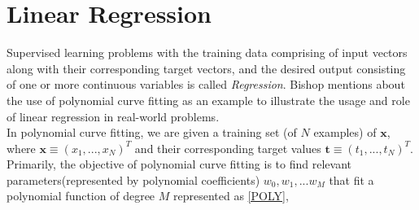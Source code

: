 \documentclass[12pt,twoside,a4paper]{article}
\title{\mytitle}
\author{\myauthors}
\date{\mydate}
\begin{document}
\maketitle

\begin{abstract}

In this day and age, automation is crucial in various industries which involve laborious and repetitive tasks. This project covers regression and classification problems, which are considered to be one of basic techniques of \textit{Pattern Recognition}. I've implemented linear models for regression, along with methods to optimize the parameters/weights of these models through the use of \textit{Maximum Likelihood Estimation} and \textit{Maximum A Posteriori Estimation}. Additonally, for classification models I've implemented the Fisher projection algorithm for the \textit{Taiji} dataset. I've also introduced the key aspects of the \textit{Central Limit Theorem}, in addition to answering few questions regarding estimating probability distributions.

\end{abstract}
\vspace{1ex}

\tableofcontents
\vfill
\pagebreak


\section{Linear Regression}

Supervised learning problems with the training data comprising of input vectors along with their corresponding target vectors, and the desired output consisting of one or more continuous variables is called \textit{Regression}. Bishop\cite{ChrisPRML} mentions about the use of polynomial curve fitting as an example to illustrate the usage and role of linear regression in real-world problems.\\
In polynomial curve fitting, we are given a training set (of $N$ examples) of $\textbf{x}$, where $\textbf{x} \equiv (x_1,...,x_N)^T$ and their corresponding target values $\textbf{t} \equiv (t_1,...,t_N)^T$.\\
Primarily, the objective of polynomial curve fitting is to find relevant parameters(represented by polynomial coefficients) $w_0, w_1, ... w_M$ that fit a polynomial function of degree $M$ represented as \ref{POLY},
\end{document}
